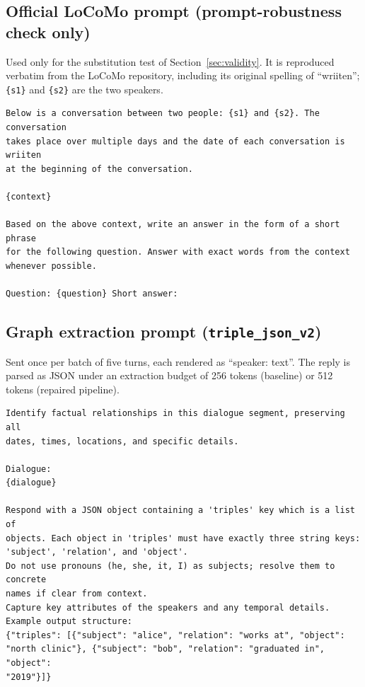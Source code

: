 \subsection*{Official LoCoMo prompt (prompt-robustness check only)}

Used only for the substitution test of Section~\ref{sec:validity}. It is reproduced verbatim
from the LoCoMo repository, including its original spelling of ``wriiten''; \texttt{\{s1\}} and
\texttt{\{s2\}} are the two speakers.

\begin{small}
\begin{verbatim}
Below is a conversation between two people: {s1} and {s2}. The conversation
takes place over multiple days and the date of each conversation is wriiten
at the beginning of the conversation.

{context}

Based on the above context, write an answer in the form of a short phrase
for the following question. Answer with exact words from the context
whenever possible.

Question: {question} Short answer:
\end{verbatim}
\end{small}

\subsection*{Graph extraction prompt (\texttt{triple\_json\_v2})}

Sent once per batch of five turns, each rendered as ``speaker: text''. The reply is parsed as
JSON under an extraction budget of 256 tokens (baseline) or 512 tokens (repaired pipeline).

\begin{small}
\begin{verbatim}
Identify factual relationships in this dialogue segment, preserving all
dates, times, locations, and specific details.

Dialogue:
{dialogue}

Respond with a JSON object containing a 'triples' key which is a list of
objects. Each object in 'triples' must have exactly three string keys:
'subject', 'relation', and 'object'.
Do not use pronouns (he, she, it, I) as subjects; resolve them to concrete
names if clear from context.
Capture key attributes of the speakers and any temporal details.
Example output structure:
{"triples": [{"subject": "alice", "relation": "works at", "object":
"north clinic"}, {"subject": "bob", "relation": "graduated in", "object":
"2019"}]}
\end{verbatim}
\end{small}

